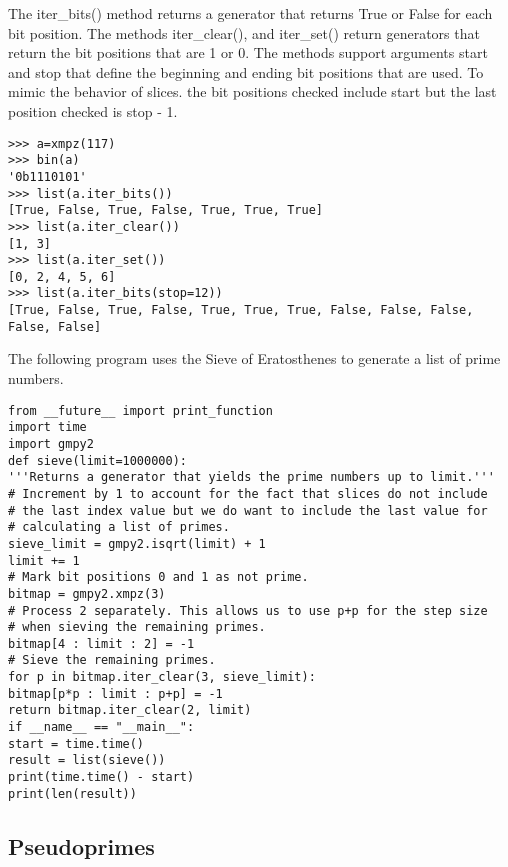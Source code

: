 The iter\_bits() method returns a generator that returns True or False for each bit position.
The methods iter\_clear(), and iter\_set() return generators that return the bit positions that
are 1 or 0. The methods support arguments start and stop that define the beginning and
ending bit positions that are used. To mimic the behavior of slices. the bit positions checked include start but the last position checked is stop - 1.

\begin{lstlisting}
>>> a=xmpz(117)
>>> bin(a)
'0b1110101'
>>> list(a.iter_bits())
[True, False, True, False, True, True, True]
>>> list(a.iter_clear())
[1, 3]
>>> list(a.iter_set())
[0, 2, 4, 5, 6]
>>> list(a.iter_bits(stop=12))
[True, False, True, False, True, True, True, False, False, False, False, False]
\end{lstlisting}

The following program uses the Sieve of Eratosthenes to generate a list of prime numbers.

\begin{lstlisting}
from __future__ import print_function
import time
import gmpy2
def sieve(limit=1000000):
'''Returns a generator that yields the prime numbers up to limit.'''
# Increment by 1 to account for the fact that slices do not include
# the last index value but we do want to include the last value for
# calculating a list of primes.
sieve_limit = gmpy2.isqrt(limit) + 1
limit += 1
# Mark bit positions 0 and 1 as not prime.
bitmap = gmpy2.xmpz(3)
# Process 2 separately. This allows us to use p+p for the step size
# when sieving the remaining primes.
bitmap[4 : limit : 2] = -1
# Sieve the remaining primes.
for p in bitmap.iter_clear(3, sieve_limit):
bitmap[p*p : limit : p+p] = -1
return bitmap.iter_clear(2, limit)
if __name__ == "__main__":
start = time.time()
result = list(sieve())
print(time.time() - start)
print(len(result))
\end{lstlisting}




\newpage
\label{AdditionalNumbertheoreticFunctions}

\subsection{Pseudoprimes}

